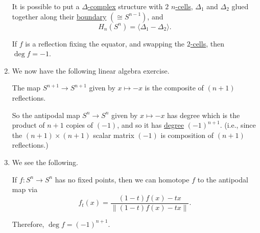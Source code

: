 \begin{remark}
\begin{enumerate}[(1)]
		      \begin{exercise}
			      It is possible to put a \hyperref[def:delta-complex]{\(\Delta\)-complex} structure with \(2\) \hyperref[def:cell]{\(n\)-cells},
			      \(\Delta_1\) and \(\Delta_2\) glued together along their \hyperref[def:boundary]{boundary} \((\cong S^{n-1})\), and
			      \[
				      H_n(S^n) = \langle \Delta_1 - \Delta_2 \rangle .
			      \]
		      \end{exercise}
		      If \(f\) is a reflection fixing the equator, and swapping the \hyperref[def:cell]{\(2\)-cells}, then \(\deg f = -1\).
		      \begin{figure}[H]
			      \centering
			      \label{fig:reflection-about-equator}
		      \end{figure}
		\item We now have the following linear algebra exercise.
		      \begin{exercise}
			      The map \(S^{n + 1} \to S^{n + 1}\) given by \(x \mapsto -x\) is the composite of \((n + 1)\) reflections.
		      \end{exercise}
		      So the antipodal map \(S^n \to S^n\) given by \(x \mapsto -x\) has degree which is the product of \(n + 1\) copies of \((-1)\), and so it has
		      \hyperref[def:degree]{degree} \((-1)^{n + 1}\). (i.e., since the \((n+1)\times (n+1)\) scalar matrix \((-1)\) is composition of \((n+1)\) reflections.)
		\item We see the following.
		      \begin{exercise}
			      If \(f\colon S^n \to S^n\) has no fixed points, then we can homotope \(f\) to the antipodal map via
			      \[
				      f_t(x) = \frac{(1 - t)f(x) - tx}{\left\lVert (1 - t)f(x) - tx\right\rVert}.
			      \]
		      \end{exercise}

		      Therefore, \(\deg f = (-1)^{n + 1}\).
	\end{enumerate}
\end{remark}